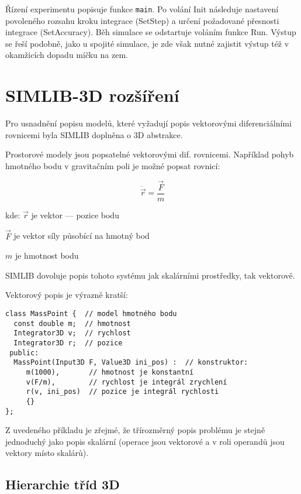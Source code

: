 \documentclass[a4paper]{article}
\begin{document}
Řízení experimentu popisuje funkce \verb|main|. Po volání Init
následuje nastavení povoleného rozsahu kroku integrace (SetStep)
a určení požadované přesnosti integrace (SetAccuracy). Běh
simulace se odstartuje voláním funkce Run. Výstup se řeší
podobně, jako u spojité simulace, je zde však nutné zajistit
výstup též v okamžicích dopadu míčku na zem.



\section{SIMLIB-3D rozšíření}

Pro usnadnění popisu modelů, které vyžadují popis vektorovými diferenciálními
rovnicemi byla SIMLIB doplněna o 3D abstrakce.

Prostorové modely jsou popsatelné vektorovými dif. rovnicemi. Například pohyb
hmotného bodu v gravitačním poli je možné popsat rovnicí:

   $$ \ddot{\vec{r}} = \frac{\vec{F}}{m} $$

kde:
   $\vec{r}$ je vektor --- pozice bodu 
   
   $\vec{F}$ je vektor síly působící na hmotný bod 
   
   $m$ je hmotnost bodu

SIMLIB dovoluje popis tohoto systému jak skalárními prostředky, tak vektorově.

Vektorový popis je výrazně kratší:

{
\small
\begin{verbatim}
class MassPoint {  // model hmotného bodu
  const double m;  // hmotnost
  Integrator3D v;  // rychlost
  Integrator3D r;  // pozice
 public:
  MassPoint(Input3D F, Value3D ini_pos) :  // konstruktor:
     m(1000),       // hmotnost je konstantní
     v(F/m),        // rychlost je integrál zrychlení
     r(v, ini_pos)  // pozice je integrál rychlosti
     {}
};
\end{verbatim}
}

Z uvedeného příkladu je zřejmé, že třírozměrný popis problému je stejně
jednoduchý jako popis skalární (operace jsou vektorové a v roli operandů jsou
vektory místo skalárů).



\subsection{Hierarchie tříd 3D}
\end{document}
